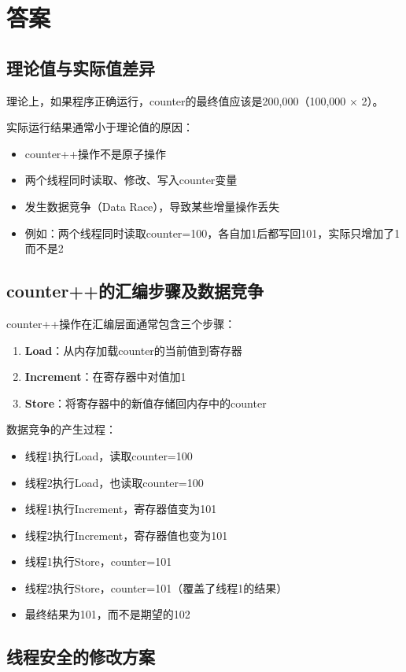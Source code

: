 \section{答案}
\subsection{理论值与实际值差异}

理论上，如果程序正确运行，counter的最终值应该是200,000（100,000 × 2）。

实际运行结果通常小于理论值的原因：
\begin{itemize}
    \item counter++操作不是原子操作
    \item 两个线程同时读取、修改、写入counter变量
    \item 发生数据竞争（Data Race），导致某些增量操作丢失
    \item 例如：两个线程同时读取counter=100，各自加1后都写回101，实际只增加了1而不是2
\end{itemize}

\subsection{counter++的汇编步骤及数据竞争}

counter++操作在汇编层面通常包含三个步骤：
\begin{enumerate}
    \item \textbf{Load}：从内存加载counter的当前值到寄存器
    \item \textbf{Increment}：在寄存器中对值加1
    \item \textbf{Store}：将寄存器中的新值存储回内存中的counter
\end{enumerate}

数据竞争的产生过程：
\begin{itemize}
    \item 线程1执行Load，读取counter=100
    \item 线程2执行Load，也读取counter=100
    \item 线程1执行Increment，寄存器值变为101
    \item 线程2执行Increment，寄存器值也变为101
    \item 线程1执行Store，counter=101
    \item 线程2执行Store，counter=101（覆盖了线程1的结果）
    \item 最终结果为101，而不是期望的102
\end{itemize}

\subsection{线程安全的修改方案}

